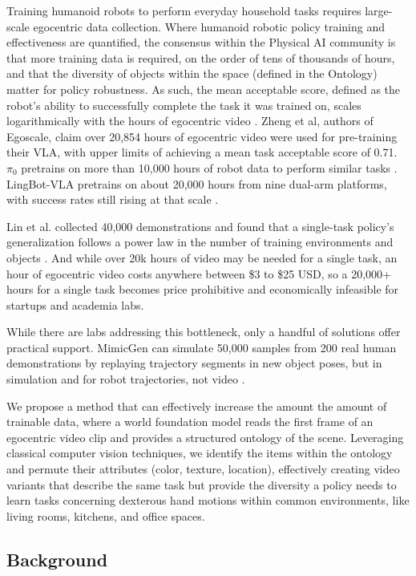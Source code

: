 \documentclass[runningheads]{llncs}
\begin{document}
Training humanoid robots to perform everyday household tasks requires large-scale egocentric data collection. Where humanoid robotic policy training and effectiveness are quantified, the consensus within the Physical AI community is that more training data is required, on the order of tens of thousands of hours, and that the diversity of objects within the space (defined in the Ontology) matter for policy robustness. As such, the mean acceptable score, defined as the robot's ability to successfully complete the task it was trained on, scales logarithmically with the hours of egocentric video \cite{r1}. Zheng et al, authors of Egoscale, claim over 20,854 hours of egocentric video were used for pre-training their VLA, with upper limits of achieving a mean task acceptable score of 0.71. $\pi_0$ pretrains on more than 10,000 hours of robot data to perform similar tasks \cite{r2}. LingBot-VLA pretrains on about 20,000 hours from nine dual-arm platforms, with success rates still rising at that scale \cite{r3}.

Lin et al. collected 40,000 demonstrations and found that a single-task policy's generalization follows a power law in the number of training environments and objects \cite{r4}. And while over 20k hours of video may be needed for a single task, an hour of egocentric video costs anywhere between \$3 to \$25 USD, so a 20,000+ hours for a single task becomes price prohibitive and economically infeasible for startups and academia labs.

While there are labs addressing this bottleneck, only a handful of solutions offer practical support. MimicGen can simulate 50,000 samples from 200 real human demonstrations by replaying trajectory segments in new object poses, but in simulation and for robot trajectories, not video \cite{r6}.

We propose a method that can effectively increase the amount the amount of trainable data, where a world foundation model reads the first frame of an egocentric video clip and provides a structured ontology of the scene. Leveraging classical computer vision techniques, we identify the items within the ontology and permute their attributes (color, texture, location), effectively creating video variants that describe the same task but provide the diversity a policy needs to learn tasks concerning dexterous hand motions within common environments, like living rooms, kitchens, and office spaces.

\subsection{Background}
\end{document}
